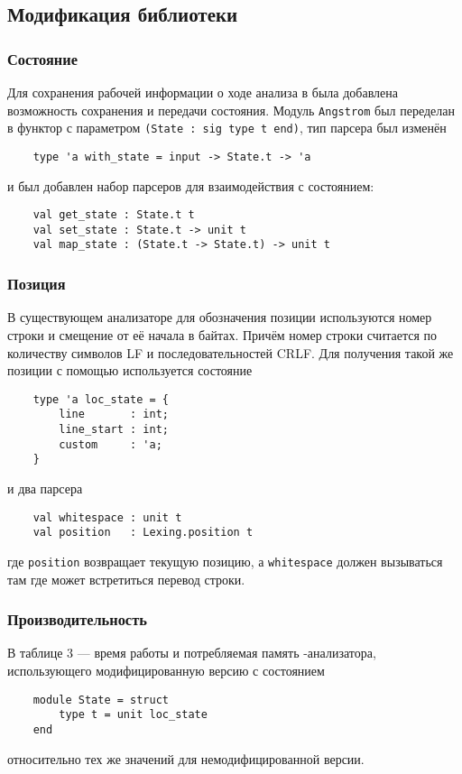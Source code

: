 \subsection{Модификация библиотеки}

\subsubsection{Состояние}

Для сохранения рабочей информации о ходе анализа в \angstrom{} была добавлена возможность сохранения и передачи состояния.
Модуль \verb|Angstrom| был переделан в функтор с параметром \lstinline{(State : sig type t end)},
тип парсера был изменён
\begin{lstlisting}
    type 'a with_state = input -> State.t -> 'a
\end{lstlisting}
и был добавлен набор парсеров для взаимодействия с состоянием:
\begin{lstlisting}
    val get_state : State.t t
    val set_state : State.t -> unit t
    val map_state : (State.t -> State.t) -> unit t
\end{lstlisting}

\subsubsection{Позиция}

В существующем анализаторе \rescript{} для обозначения позиции используются номер строки и смещение от её начала в байтах.
Причём номер строки считается по количеству символов \textsc{LF} и последовательностей \textsc{CRLF}.
Для получения такой же позиции с помощью \angstrom{} используется состояние
\begin{lstlisting}
    type 'a loc_state = {
        line       : int;
        line_start : int;
        custom     : 'a;
    }
\end{lstlisting}
и два парсера
\begin{lstlisting}
    val whitespace : unit t
    val position   : Lexing.position t
\end{lstlisting}
где \verb|position| возвращает текущую позицию, а \verb|whitespace| должен вызываться там где может встретиться перевод строки.

\newpage
\subsubsection{Производительность}

В таблице 3 --- время работы и потребляемая память \json-анализатора, использующего модифицированную версию \angstrom{}
с состоянием
\begin{lstlisting}
    module State = struct
        type t = unit loc_state
    end
\end{lstlisting}
относительно тех же значений для немодифицированной версии.

